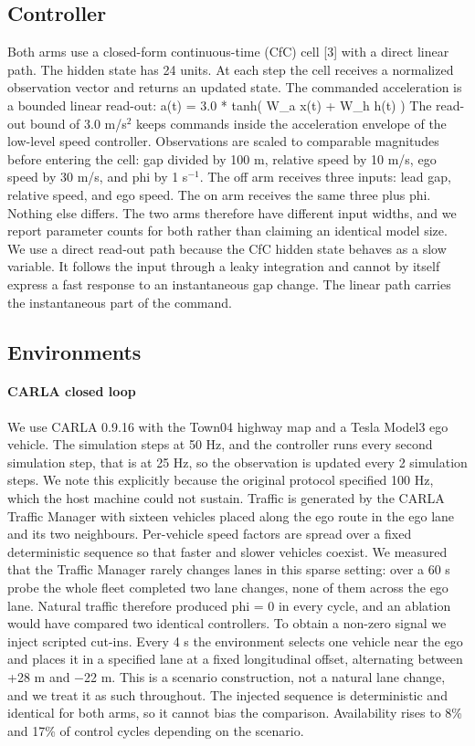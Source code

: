 \documentclass[journal]{IEEEtran}
\begin{document}
\subsection{Controller}
Both arms use a closed-form continuous-time (CfC) cell [3] with a direct linear path.
The hidden state has 24 units. At each step the cell receives a normalized observation vector and returns
an updated state.
The commanded acceleration is a bounded linear read-out:
    a(t) = 3.0 * tanh( W\_a x(t) + W\_h h(t) )
The read-out bound of 3.0 m/s$^{2}$ keeps commands inside the acceleration envelope of the low-level speed
controller. Observations are scaled to comparable magnitudes before entering the cell: gap divided by
100 m, relative speed by 10 m/s, ego speed by 30 m/s, and phi by 1 s$^{-1}$.
The off arm receives three inputs: lead gap, relative speed, and ego speed. The on arm receives the
same three plus phi. Nothing else differs. The two arms therefore have different input widths, and we
report parameter counts for both rather than claiming an identical model size.
We use a direct read-out path because the CfC hidden state behaves as a slow variable. It follows the
input through a leaky integration and cannot by itself express a fast response to an instantaneous gap
change. The linear path carries the instantaneous part of the command.
\subsection{Environments}
\paragraph{CARLA closed loop}
We use CARLA 0.9.16 with the Town04 highway map and a Tesla Model3 ego
vehicle. The simulation steps at 50 Hz, and the controller runs every second simulation step, that is at
25 Hz, so the observation is updated every 2 simulation steps. We note this explicitly because the
original protocol specified 100 Hz, which the host machine could not sustain.
Traffic is generated by the CARLA Traffic Manager with sixteen vehicles placed along the ego route in
the ego lane and its two neighbours. Per-vehicle speed factors are spread over a fixed deterministic
sequence so that faster and slower vehicles coexist. We measured that the Traffic Manager rarely
changes lanes in this sparse setting: over a 60 s probe the whole fleet completed two lane changes,
none of them across the ego lane. Natural traffic therefore produced phi = 0 in every cycle, and an
ablation would have compared two identical controllers.
To obtain a non-zero signal we inject scripted cut-ins. Every 4 s the environment selects one vehicle
near the ego and places it in a specified lane at a fixed longitudinal offset, alternating between
+28 m and $-$22 m. This is a scenario construction, not a natural lane change, and we treat it as such
throughout. The injected sequence is deterministic and identical for both arms, so it cannot bias the
comparison. Availability rises to 8\% and 17\% of control cycles depending on the scenario.
\end{document}
